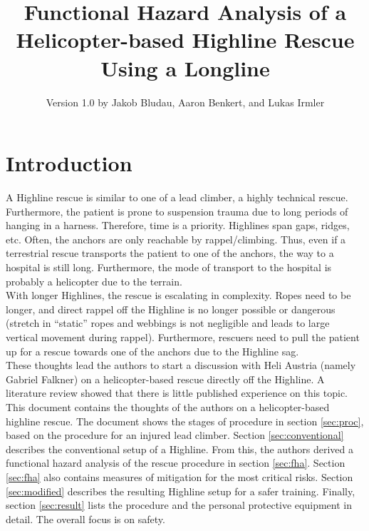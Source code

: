 \documentclass[a4paper,10pt]{scrartcl}
\title{Functional Hazard Analysis of a Helicopter-based Highline Rescue Using a Longline}
\author{Version 1.0 by Jakob Bludau, Aaron Benkert, and Lukas Irmler}
\begin{document}
\maketitle

\tableofcontents

\section{Introduction}
\label{sec:intro}
A Highline rescue is similar to one of a lead climber, a highly technical rescue. Furthermore, the patient is prone to suspension trauma due to long periods of hanging in a harness. Therefore, time is a priority.
Highlines span gaps, ridges, etc. Often, the anchors are only reachable by rappel/climbing. Thus, even if a terrestrial rescue transports the patient to one of the anchors, the way to a hospital is still long. Furthermore, the mode of transport to the hospital is probably a helicopter due to the terrain.\\

With longer Highlines, the rescue is escalating in complexity. Ropes need to be longer, and direct rappel off the Highline is no longer possible or dangerous (stretch in “static” ropes and webbings is not negligible and leads to large vertical movement during rappel). Furthermore, rescuers need to pull the patient up for a rescue towards one of the anchors due to the Highline sag. \\

These thoughts lead the authors to start a discussion with Heli Austria (namely Gabriel Falkner) on a helicopter-based rescue directly off the Highline. A literature review showed that there is little published experience on this topic.\\

This document contains the thoughts of the authors on a helicopter-based highline rescue. The document shows the stages of procedure in section \ref{sec:proc}, based on the procedure for an injured lead climber. Section \ref{sec:conventional} describes the conventional setup of a Highline. From this, the authors derived a functional hazard analysis of the rescue procedure in section \ref{sec:fha}. Section \ref{sec:fha} also contains measures of mitigation for the most critical risks. Section \ref{sec:modified} describes the resulting Highline setup for a safer training. Finally, section \ref{sec:result} lists the procedure and the personal protective equipment in detail. The overall focus is on safety.
\end{document}
